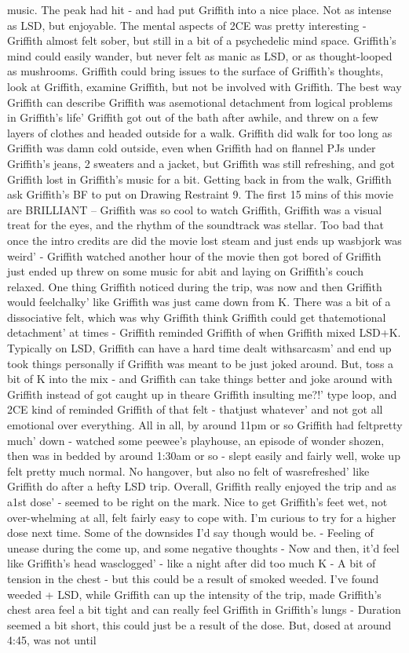 \documentclass[12pt]{book}
\begin{document}
music. The peak had hit - and had put Griffith into a nice place. Not as intense as LSD, but enjoyable. The mental aspects of 2CE was pretty interesting - Griffith almost felt sober, but still in a bit of a psychedelic mind space. Griffith's mind could easily wander, but never felt as manic as LSD, or as thought-looped as mushrooms. Griffith could bring issues to the surface of Griffith's thoughts, look at Griffith, examine Griffith, but not be involved with Griffith. The best way Griffith can describe Griffith was asemotional detachment from logical problems in Griffith's life' Griffith got out of the bath after awhile, and threw on a few layers of clothes and headed outside for a walk. Griffith did walk for too long as Griffith was damn cold outside, even when Griffith had on flannel PJs under Griffith's jeans, 2 sweaters and a jacket, but Griffith was still refreshing, and got Griffith lost in Griffith's music for a bit. Getting back in from the walk, Griffith ask Griffith's BF to put on Drawing Restraint 9. The first 15 mins of this movie are BRILLIANT -- Griffith was so cool to watch Griffith, Griffith was a visual treat for the eyes, and the rhythm of the soundtrack was stellar. Too bad that once the intro credits are did the movie lost steam and just ends up wasbjork was weird' - Griffith watched another hour of the movie then got bored of Griffith just ended up threw on some music for abit and laying on Griffith's couch relaxed. One thing Griffith noticed during the trip, was now and then Griffith would feelchalky' like Griffith was just came down from K. There was a bit of a dissociative felt, which was why Griffith think Griffith could get thatemotional detachment' at times - Griffith reminded Griffith of when Griffith mixed LSD+K. Typically on LSD, Griffith can have a hard time dealt withsarcasm' and end up took things personally if Griffith was meant to be just joked around. But, toss a bit of K into the mix - and Griffith can take things better and joke around with Griffith instead of got caught up in theare Griffith insulting me?!' type loop, and 2CE kind of reminded Griffith of that felt - thatjust whatever' and not got all emotional over everything. All in all, by around 11pm or so Griffith had feltpretty much' down - watched some peewee's playhouse, an episode of wonder shozen, then was in bedded by around 1:30am or so - slept easily and fairly well, woke up felt pretty much normal. No hangover, but also no felt of wasrefreshed' like Griffith do after a hefty LSD trip. Overall, Griffith really enjoyed the trip and as a1st dose' - seemed to be right on the mark. Nice to get Griffith's feet wet, not over-whelming at all, felt fairly easy to cope with. I'm curious to try for a higher dose next time. Some of the downsides I'd say though would be. - Feeling of unease during the come up, and some negative thoughts - Now and then, it'd feel like Griffith's head wasclogged' - like a night after did too much K - A bit of tension in the chest - but this could be a result of smoked weeded. I've found weeded + LSD, while Griffith can up the intensity of the trip, made Griffith's chest area feel a bit tight and can really feel Griffith in Griffith's lungs - Duration seemed a bit short, this could just be a result of the dose. But, dosed at around 4:45, was not until 
\end{document}
